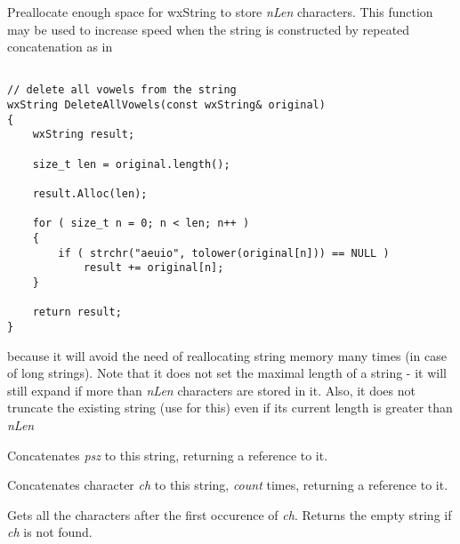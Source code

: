 \label{wxstringalloc}


Preallocate enough space for wxString to store {\it nLen} characters. This function
may be used to increase speed when the string is constructed by repeated
concatenation as in

\begin{verbatim}

// delete all vowels from the string
wxString DeleteAllVowels(const wxString& original)
{
    wxString result;

    size_t len = original.length();

    result.Alloc(len);

    for ( size_t n = 0; n < len; n++ )
    {
        if ( strchr("aeuio", tolower(original[n])) == NULL )
            result += original[n];
    }

    return result;
}

\end{verbatim}

because it will avoid the need of reallocating string memory many times (in case
of long strings). Note that it does not set the maximal length of a string - it
will still expand if more than {\it nLen} characters are stored in it. Also, it
does not truncate the existing string (use 
 for this) even if its current length is
greater than {\it nLen}

\label{wxstringappend}


Concatenates {\it psz} to this string, returning a reference to it.


Concatenates character {\it ch} to this string, {\it count} times, returning a reference
to it.

\label{wxstringafterfirst}


Gets all the characters after the first occurence of {\it ch}.
Returns the empty string if {\it ch} is not found.

\label{wxstringafterlast}


